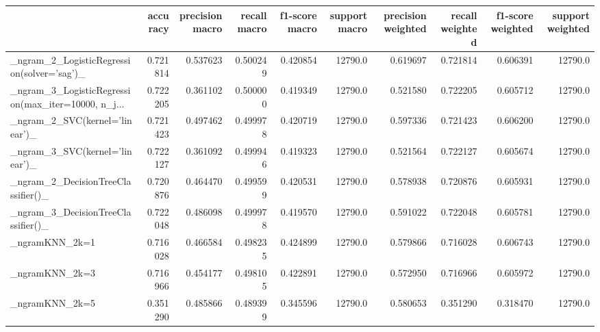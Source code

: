 \begin{tabular}{lrrrrrrrrr}
\toprule
{} &  accuracy &  precision macro &  recall macro &  f1-score macro &  support macro &  precision weighted &  recall weighted &  f1-score weighted &  support weighted \\
\midrule
\_ngram\_2\_LogisticRegression(solver='sag')\_         &  0.721814 &         0.537623 &      0.500249 &        0.420854 &        12790.0 &            0.619697 &         0.721814 &           0.606391 &           12790.0 \\
\_ngram\_3\_LogisticRegression(max\_iter=10000, n\_j... &  0.722205 &         0.361102 &      0.500000 &        0.419349 &        12790.0 &            0.521580 &         0.722205 &           0.605712 &           12790.0 \\
\_ngram\_2\_SVC(kernel='linear')\_                     &  0.721423 &         0.497462 &      0.499978 &        0.420719 &        12790.0 &            0.597336 &         0.721423 &           0.606200 &           12790.0 \\
\_ngram\_3\_SVC(kernel='linear')\_                     &  0.722127 &         0.361092 &      0.499946 &        0.419323 &        12790.0 &            0.521564 &         0.722127 &           0.605674 &           12790.0 \\
\_ngram\_2\_DecisionTreeClassifier()\_                 &  0.720876 &         0.464470 &      0.499599 &        0.420531 &        12790.0 &            0.578938 &         0.720876 &           0.605931 &           12790.0 \\
\_ngram\_3\_DecisionTreeClassifier()\_                 &  0.722048 &         0.486098 &      0.499978 &        0.419570 &        12790.0 &            0.591022 &         0.722048 &           0.605781 &           12790.0 \\
\_ngramKNN\_2k=1                                     &  0.716028 &         0.466584 &      0.498235 &        0.424899 &        12790.0 &            0.579866 &         0.716028 &           0.606743 &           12790.0 \\
\_ngramKNN\_2k=3                                     &  0.716966 &         0.454177 &      0.498105 &        0.422891 &        12790.0 &            0.572950 &         0.716966 &           0.605972 &           12790.0 \\
\_ngramKNN\_2k=5                                     &  0.351290 &         0.485866 &      0.489399 &        0.345596 &        12790.0 &            0.580653 &         0.351290 &           0.318470 &           12790.0 \\

\end{tabular}
